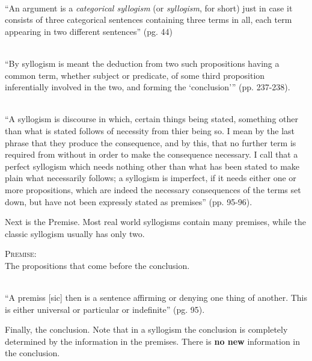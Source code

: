 \documentclass{article}
\begin{document}
\begin{subdefinition} \cite{barker03logic}\\
``An argument is a \textsl{categorical syllogism} (or \textsl{syllogism}, for short) just in case it consists of three categorical sentences containing three terms in all, each term appearing in two different sentences'' (pg. 44)
\end{subdefinition}


\begin{subdefinition} \cite{boole1854laws}\\
``By syllogism is meant the deduction from two such propositions having a common term, whether subject or predicate, of some third proposition inferentially involved in the two, and forming the `conclusion''' (pp. 237-238).
\end{subdefinition}


\begin{subdefinition} \cite{aristotle66syllogism}\\
``A syllogism is discourse in which, certain things being stated, something other than what is stated follows of necessity from thier being so. I mean by the last phrase that they produce the consequence, and by this, that no further term is required from without in order to make the consequence necessary.
I call that a perfect syllogism which needs nothing other than what has been stated to make plain what necessarily follows; a syllogism is imperfect, if it needs either one or more propositions, which are indeed the necessary consequences of the terms set down, but have not been expressly stated as premises'' (pp. 95-96).
\end{subdefinition}

Next is the Premise. Most real world syllogisms contain many premises, while the classic syllogism usually has only two.

\begin{definition}\label{premise}
\textsc{Premise}:\\
The propositions that come before the conclusion.
\end{definition}

\begin{subdefinition} \cite{aristotle66syllogism}\\
``A premiss [sic] then is a sentence affirming or denying one thing of another. This is either universal or particular or indefinite'' (pg. 95).
\end{subdefinition}

Finally, the conclusion. Note that in a syllogism the conclusion is completely determined by the information in the premises. There is \textbf{no new} information in the conclusion.
\end{document}
